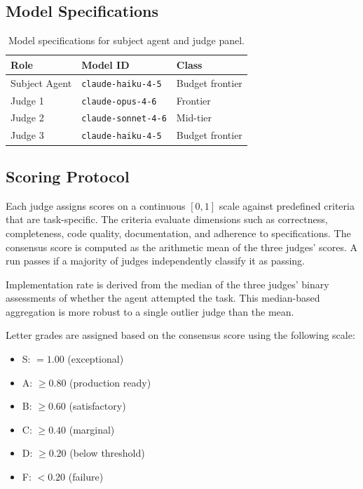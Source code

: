 \documentclass[11pt]{article}
\begin{document}
\subsection{Model Specifications}

\begin{table}[htbp]
  \centering
  \caption{Model specifications for subject agent and judge panel.}
  \label{tab:model_specs}
  \small
  \begin{tabular}{lll}
    \toprule
    Role & Model ID & Class \\
    \midrule
    Subject Agent & \texttt{claude-haiku-4-5} & Budget frontier \\
    Judge 1 & \texttt{claude-opus-4-6} & Frontier \\
    Judge 2 & \texttt{claude-sonnet-4-6} & Mid-tier \\
    Judge 3 & \texttt{claude-haiku-4-5} & Budget frontier \\
    \bottomrule
  \end{tabular}
\end{table}

\subsection{Scoring Protocol}

Each judge assigns scores on a continuous $[0, 1]$ scale against predefined
criteria that are task-specific. The criteria evaluate dimensions such as
correctness, completeness, code quality, documentation, and adherence to
specifications. The consensus score is computed as the arithmetic mean of the
three judges' scores. A run passes if a majority of judges independently
classify it as passing.

Implementation rate is derived from the median of the three judges' binary
assessments of whether the agent attempted the task. This median-based
aggregation is more robust to a single outlier judge than the mean.

Letter grades are assigned based on the consensus score using the following
scale:
\begin{itemize}
  \item S: $= 1.00$ (exceptional)
  \item A: $\geq 0.80$ (production ready)
  \item B: $\geq 0.60$ (satisfactory)
  \item C: $\geq 0.40$ (marginal)
  \item D: $\geq 0.20$ (below threshold)
  \item F: $< 0.20$ (failure)
\end{itemize}
\end{document}

